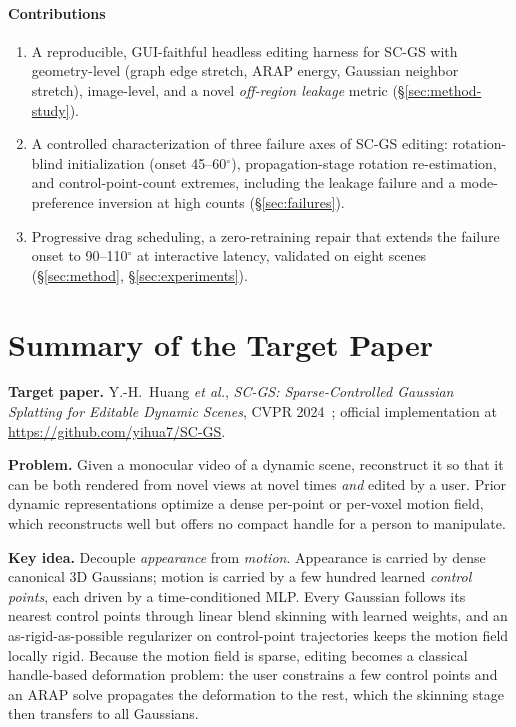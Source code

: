 \documentclass[10pt,twocolumn]{article}
\newcommand{\etal}{\emph{et al.}}
\begin{document}
\paragraph{Contributions}
\begin{enumerate}\itemsep2pt
  \item A reproducible, GUI-faithful headless editing harness for SC-GS with
        geometry-level (graph edge stretch, ARAP energy, Gaussian neighbor
        stretch), image-level, and a novel \emph{off-region leakage} metric
        (\S\ref{sec:method-study}).
  \item A controlled characterization of three failure axes of SC-GS editing:
        rotation-blind initialization (onset 45--60$^\circ$), propagation-stage
        rotation re-estimation, and control-point-count extremes, including the
        leakage failure and a mode-preference inversion at high counts
        (\S\ref{sec:failures}).
  \item Progressive drag scheduling, a zero-retraining repair that extends the
        failure onset to 90--110$^\circ$ at interactive latency, validated on
        eight scenes (\S\ref{sec:method}, \S\ref{sec:experiments}).
\end{enumerate}

\section{Summary of the Target Paper}
\label{sec:summary}

\textbf{Target paper.} Y.-H.~Huang \etal, \emph{SC-GS: Sparse-Controlled
Gaussian Splatting for Editable Dynamic Scenes}, CVPR 2024~\cite{scgs};
official implementation at \url{https://github.com/yihua7/SC-GS}.

\textbf{Problem.} Given a monocular video of a dynamic scene, reconstruct it so
that it can be both rendered from novel views at novel times \emph{and} edited
by a user. Prior dynamic representations optimize a dense per-point or
per-voxel motion field, which reconstructs well but offers no compact handle
for a person to manipulate.

\textbf{Key idea.} Decouple \emph{appearance} from \emph{motion}. Appearance is
carried by dense canonical 3D Gaussians; motion is carried by a few hundred
learned \emph{control points}, each driven by a time-conditioned MLP. Every
Gaussian follows its nearest control points through linear blend skinning with
learned weights, and an as-rigid-as-possible regularizer on control-point
trajectories keeps the motion field locally rigid. Because the motion field is
sparse, editing becomes a classical handle-based deformation problem: the user
constrains a few control points and an ARAP solve propagates the deformation to
the rest, which the skinning stage then transfers to all Gaussians.
\end{document}
